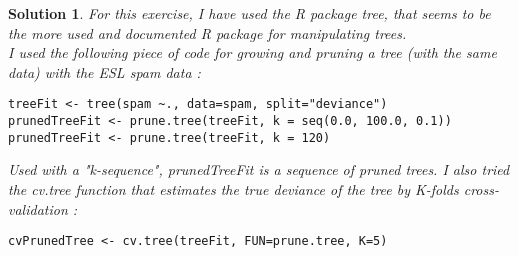 \documentclass[12pt,a4paper]{article}
\newtheorem{solution}{Solution}
\begin{document}
\begin{solution}
For this exercise, I have used the R package tree, that seems to be the more used and documented R package for manipulating trees.\\

I used the following piece of code for growing and pruning a tree (with the same data) with the ESL spam data : 

\begin{verbatim}
treeFit <- tree(spam ~., data=spam, split="deviance")
prunedTreeFit <- prune.tree(treeFit, k = seq(0.0, 100.0, 0.1))
prunedTreeFit <- prune.tree(treeFit, k = 120)
\end{verbatim}

Used with a "k-sequence", prunedTreeFit is a sequence of pruned trees. I also tried the cv.tree function that estimates the true deviance of the tree by K-folds cross-validation : 

\begin{verbatim}
cvPrunedTree <- cv.tree(treeFit, FUN=prune.tree, K=5)
\end{verbatim}

\end{solution}
\end{document}

